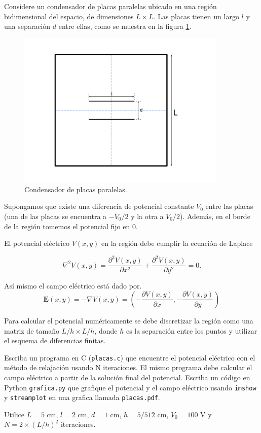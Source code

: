 \documentclass[11pt,letterpaper]{exam}
\begin{document}
\begin{questions}

Considere un condensador de placas paralelas ubicado en una regi\'on
bidimensional del espacio, de dimensiones $L\times L$. Las placas
tienen un largo $l$ y una separaci\'on $d$ entre ellas, como se
muestra en la figura \ref{fig:gridplates}. 

\begin{figure}[H]
  \centering
  \includegraphics[width=10cm]{gridplates}
  \caption{\label{fig:gridplates} Condensador de placas paralelas.}
\end{figure}

Supongamos que existe una diferencia de potencial constante $V_0$
entre las placas (una de las placas se encuentra a $-V_0/2$ y la otra
a $V_0/2$). Adem\'as, en el borde de la regi\'on tomemos el potencial
fijo en $0$. 

El potencial el\'ectrico $V(x,y)$ en la regi\'on debe cumplir la
ecuaci\'on de Laplace 

\begin{equation*}
 \nabla^2V(x,y) = \frac{\partial^2 V(x,y)}{\partial x^2} +
 \frac{\partial^2 V(x,y)}{\partial y^2}=0. 
\end{equation*}

As\'i mismo el campo el\'ectrico est\'a dado por.
\begin{equation*}
\mathbf{E}(x,y) = -\nabla V(x,y) = \left(-\frac{\partial V(x,y)}{\partial x}, -\frac{\partial V(x,y)}{\partial y}\right)
\end{equation*}

Para calcular el potencial num\'ericamente se debe discretizar la
regi\'on como una matriz de tama\~no $L/h \times L/h$, donde $h$ es la
separaci\'on entre los puntos y utilizar el esquema de diferencias
finitas. 

Escriba un programa en C (\verb"placas.c") que encuentre el
potencial el\'ectrico con el m\'etodo de relajaci\'on usando N
iteraciones. El mismo programa debe calcular el campo el\'ectrico a
partir de la soluci\'on final del potencial.
Escriba un c\'odigo en Python \verb'grafica.py' que grafique el
potencial y el campo el\'ectrico usando \verb'imshow' y
\verb'streamplot' en una grafica llamada \verb'placas.pdf'.

Utilice $L = 5$ cm, $l = 2$ cm, $d = 1$ cm, $h = 5/512$ cm, $V_0 = 100$ V y $N = 2\times (L/h)^2$ iteraciones.
 
\end{questions}
\end{document}
